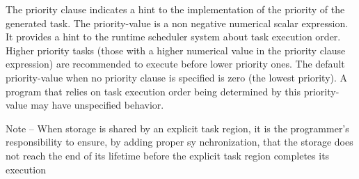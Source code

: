 The priority clause indicates a hint to the implementation of the priority of the generated task. The priority-value is a non negative numerical scalar expression. It provides a hint to the runtime scheduler system about task execution order. Higher priority tasks (those with a higher numerical value in the priority clause expression) are recommended to execute before lower priority ones. The default priority-value when no priority clause is specified is zero (the lowest priority). A program that relies on task execution order being determined by this priority-value may have unspecified behavior.

Note – When storage is shared by an explicit task region, it is the programmer's responsibility to ensure, by adding proper sy nchronization, that the storage does not reach the end of its lifetime before the explicit task region completes its execution 
